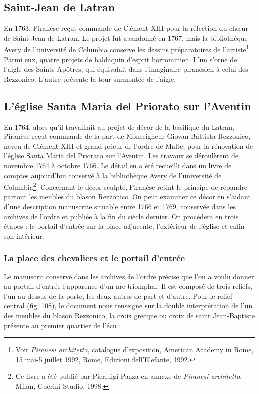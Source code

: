 \documentclass[12pt,twoside,openany]{book}
\begin{document}
\subsection{Saint-Jean de Latran}

En 1763, Piranèse reçut commande de Clément XIII pour la réfection du chœur de Saint-Jean de Latran. Le projet fut abandonné en 1767, mais la bibliothèque Avery de l’université de Columbia conserve les dessins préparatoires de l’artiste\footnote{Voir \textit{Piranesi architetto}, catalogue d’exposition, American Academy in Rome, 15 mai-5 juillet 1992, Rome, Edizioni dell’Elefante, 1992.}. Parmi eux, quatre projets de baldaquin d’esprit borrominien. L’un s’orne de l’aigle des Saints-Apôtres, qui équivalait dans l’imaginaire piranésien à celui des Rezzonico. L’autre présente la tour surmontée de l’aigle.

\subsection{L’église Santa Maria del Priorato sur l’Aventin}

En 1764, alors qu’il travaillait au projet de décor de la basilique du Latran, Piranèse reçut commande de la part de Monseigneur Giovan Battista Rezzonico, neveu de Clément XIII et grand prieur de l’ordre de Malte, pour la rénovation de l’église Santa Maria del Priorato sur l’Aventin. Les travaux se déroulèrent de novembre 1764 à octobre 1766. Le détail en a été recueilli dans un livre de comptes aujourd’hui conservé à la bibliothèque Avery de l’université de Columbia\footnote{Ce livre a été publié par Pierluigi Panza en annexe de \textit{Piranesi architetto}, Milan, Guerini Studio, 1998.}. Concernant le décor sculpté, Piranèse retint le principe de répandre partout les meubles du blason Rezzonico. On peut examiner ce décor en s’aidant d’une description manuscrite situable entre 1766 et 1769, conservée dans les archives de l’ordre et publiée à la fin du siècle dernier. On procédera en trois étapes : le portail d’entrée sur la place adjacente, l’extérieur de l’église et enfin son intérieur.

\subsubsection{La place des chevaliers et le portail d’entrée}

Le manuscrit conservé dans les archives de l’ordre précise que l’on a voulu donner au portail d’entrée l’apparence d’un arc triomphal. Il est composé de trois reliefs, l’un au-dessus de la porte, les deux autres de part et d’autre. Pour le relief central (fig. 108), le document nous renseigne sur la double interprétation de l’un des meubles du blason Rezzonico, la croix grecque ou croix de saint Jean-Baptiste présente au premier quartier de l’écu :
\end{document}
